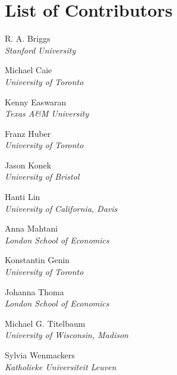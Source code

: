 
\bigskip

\begingroup
\let\clearpage\relax
\let\cleardoublepage\relax
\let\cleardoublepage\relax
\chapter*{List of Contributors}

\noindent R. A. Briggs\\
{\itshape Stanford University}
\setlength{\parskip}{\baselineskip}

\noindent Michael Caie\\
{\itshape University of Toronto}

\noindent Kenny Easwaran\\
{\itshape Texas A\&M University}

\noindent Franz Huber\\
{\itshape University of Toronto}

\noindent Jason Konek\\
{\itshape University of Bristol}

\noindent Hanti Lin\\
{\itshape University of California, Davis}

\noindent Anna Mahtani\\
{\itshape London School of Economics}

\noindent Konstantin Genin\\
{\itshape University of Toronto}

\noindent Johanna Thoma\\
{\itshape London School of Economics}

\noindent Michael G. Titelbaum\\
{\itshape University of Wisconsin, Madison}

\noindent Sylvia Wenmackers\\
{\itshape Katholieke Universiteit Leuven}

\endgroup
